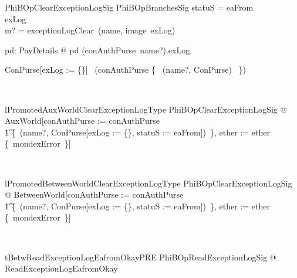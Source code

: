 \begin{LNewSDef}
\begin{schema}{PhiBOpClearExceptionLogSig}
    PhiBOpBranchesSig
\where
    statuS = eaFrom \\
    exLog \neq \emptyset \\
    m? = exceptionLogClear~(name, image~exLog)
    \also

    \forall pd: PayDetails @ \lnot pd \in (conAuthPurse~name?).exLog
    \also

    \lnot \theta ConPurse[exLog := \{\}] \in \ran~(conAuthPurse \oplus \{~ (name?, \theta ConPurse)~ \})
\end{schema}~\end{LNewSDef}

\begin{LNewLemma}
\begin{theorem}{lPromotedAuxWorldClearExceptionLogType}
    \forall PhiBOpClearExceptionLogSig @ AuxWorld[conAuthPurse := conAuthPurse~\oplus \\
        \t1 \{~(name?, \theta ConPurse[exLog := \{\}, statuS := eaFrom])~\}, ether := ether \cup \{~mondexError~\}]
\end{theorem}~\end{LNewLemma}

\begin{LNewLemma}
\begin{theorem}{lPromotedBetweenWorldClearExceptionLogType}
    \forall PhiBOpClearExceptionLogSig @ BetweenWorld[conAuthPurse := conAuthPurse~\oplus \\
        \t1 \{~(name?, \theta ConPurse[exLog := \{\}, statuS := eaFrom])~\}, ether := ether \cup \{~mondexError~\}]
\end{theorem}~\end{LNewLemma}

\begin{LNewThm}
\begin{theorem}{tBetwReadExceptionLogEafromOkayPRE}
   \forall PhiBOpReadExceptionLogSig @ \pre ReadExceptionLogEafromOkay
\end{theorem}~\end{LNewThm}

